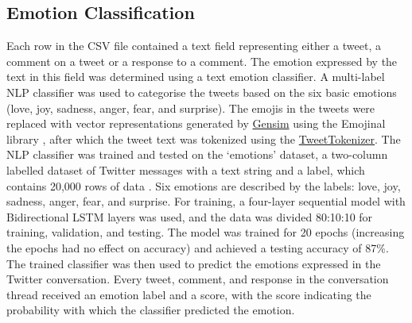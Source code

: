 \documentclass[acmtog]{acmart}
\begin{document}
\subsection{Emotion Classification}
Each row in the CSV file contained a text field representing either a tweet, a comment on a tweet or a response to a comment. The emotion expressed by the text in this field was determined using a text emotion classifier. A multi-label NLP classifier was used to categorise the tweets based on the six basic emotions (love, joy, sadness, anger, fear, and surprise). The emojis in the tweets were replaced with vector representations generated by \href{https://radimrehurek.com/gensim/}{Gensim} using the Emojinal library \cite{barry2021emojional}, after which the tweet text was tokenized using the \href{https://www.nltk.org/api/nltk.tokenize.casual.html}{TweetTokenizer}. The NLP classifier was trained and tested on the `emotions' dataset, a two-column labelled dataset of Twitter messages with a text string and a label, which contains 20,000 rows of data \cite{saravia-etal-2018-carer}. Six emotions are described by the labels: love, joy, sadness, anger, fear, and surprise. For training, a four-layer sequential model with Bidirectional LSTM layers was used, and the data was divided 80:10:10 for training, validation, and testing. The model was trained for 20 epochs (increasing the epochs had no effect on accuracy) and achieved a testing accuracy of 87\%. The trained classifier was then used to predict the emotions expressed in the Twitter conversation. Every tweet, comment, and response in the conversation thread received an emotion label and a score, with the score indicating the probability with which the classifier predicted the emotion.
\end{document}
